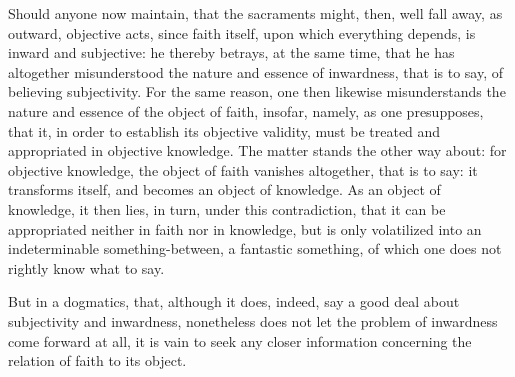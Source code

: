 \documentclass[12pt]{book}
\begin{document}
Should anyone now maintain, that the sacraments might, then, well fall away, as outward, objective acts, since faith itself, upon which everything depends, is inward and subjective: he thereby betrays, at the same time, that he has altogether misunderstood the nature and essence of inwardness, that is to say, of believing subjectivity. For the same reason, one then likewise misunderstands the nature and essence of the object of faith, insofar, namely, as one presupposes, that it, in order to establish its objective validity, must be treated and appropriated in objective knowledge. The matter stands the other way about: for objective knowledge, the object of faith vanishes altogether, that is to say: it transforms itself, and becomes an object of knowledge. As an object of knowledge, it then lies, in turn, under this contradiction, that it can be appropriated neither in faith nor in knowledge, but is only volatilized into an indeterminable something-between, a fantastic something, of which one does not rightly know what to say.

But in a dogmatics, that, although it does, indeed, say a good deal about subjectivity and inwardness, nonetheless does not let the problem of inwardness come forward at all, it is
vain to seek any closer information concerning the relation of faith to its object.
\end{document}
